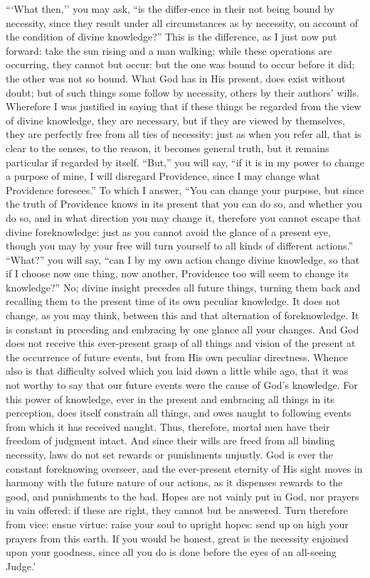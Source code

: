 ```What then,'' you may ask, ``is the differ-ence in their
not being bound by necessity, since they result under all
circumstances as by necessity, on account of the condition of divine
knowledge?'' This is the difference, as I just now put forward: take
the sun rising and a man walking; while these operations are
occurring, they cannot but occur: but the one was bound to occur
before it did; the other was not so bound. What God has in His
present, does exist without doubt; but of such things some follow by
necessity, others by their authors' wills. Wherefore I was justified
in saying that if these things be regarded from the view of divine
knowledge, they are necessary, but if they are viewed by themselves,
they are perfectly free from all ties of necessity: just as when you
refer all, that is clear to the senses, to the reason, it becomes
general truth, but it remains particular if regarded by itself.
``But,'' you will say, ``if it is in my power to change a purpose of
mine, I will disregard Providence, since I may change what Providence
foresees.'' To which I answer, ``You can change your purpose, but
since the truth of Providence knows in its present that you can do so,
and whether you do so, and in what direction you may change it,
therefore you cannot escape that divine foreknowledge: just as you
cannot avoid the glance of a present eye, though you may by your free
will turn yourself to all kinds of different actions.'' ``What?'' you
will say, ``can I by my own action change  divine knowledge,
so that if I choose now one thing, now another, Providence too will
seem to change its knowledge?'' No; divine insight precedes all future
things, turning them back and recalling them to the present time of
its own peculiar knowledge. It does not change, as you may think,
between this and that alternation of foreknowledge. It is constant in
preceding and embracing by one glance all your changes. And God does
not receive this ever-present grasp of all things and vision of the
present at the occurrence of future events, but from His own peculiar
directness. Whence also is that difficulty solved which you laid down
a little while ago, that it was not worthy to say that our future
events were the cause of God's knowledge. For this power of knowledge,
ever in the present and embracing all things in its perception, does
itself constrain all things, and owes naught to following events from
which it has received naught. Thus, therefore, mortal men have their
freedom of judgment intact. And since their wills are freed from all
binding necessity, laws do not set rewards or punishments unjustly.
God is ever the constant foreknowing overseer, and the ever-present
eternity of His sight moves in harmony with the future nature of our
actions, as it dispenses rewards to the good, and punishments to the
bad. Hopes are not vainly put in God, nor prayers in vain offered: if
these are right, they cannot but be answered. Turn 
therefore from vice: ensue virtue: raise your soul to upright hopes:
send up on high your prayers from this earth. If you would be honest,
great is the necessity enjoined upon your goodness, since all you do
is done before the eyes of an all-seeing Judge.'

